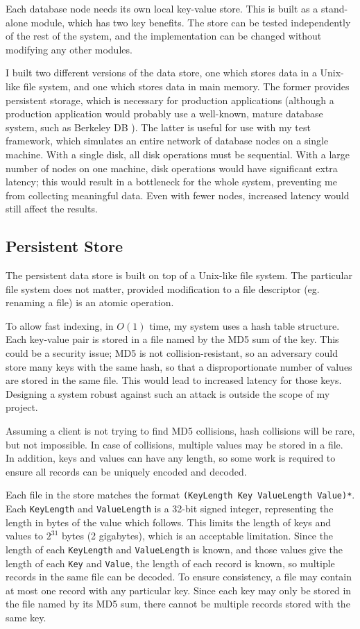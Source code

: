 \documentclass[12pt,a4paper,twoside,openany]{report}
\begin{document}
Each database node needs its own local key-value store.
This is built as a stand-alone module, which has two key benefits. The store can be tested independently of the rest of the system, and the implementation can be changed without modifying any other modules.

I built two different versions of the data store, one which stores data in a Unix-like file system, and one which stores data in main memory. The former provides persistent storage, which is necessary for production applications (although a production application would probably use a well-known, mature database system, such as Berkeley DB \cite{decandia2007dynamo}). The latter is useful for use with my test framework, which simulates an entire network of database nodes on a single machine.
With a single disk, all disk operations must be sequential. With a large number of nodes on one machine, disk operations would have significant extra latency; this would result in a bottleneck for the whole system, preventing me from collecting meaningful data. Even with fewer nodes, increased latency would still affect the results.

\subsection{Persistent Store}

The persistent data store is built on top of a Unix-like file system. The particular file system does not matter, provided modification to a file descriptor (eg. renaming a file) is an atomic operation.

To allow fast indexing, in $O(1)$ time, my system uses a hash table structure. Each key-value pair is stored in a file named by the MD5 sum of the key. This could be a security issue; MD5 is not collision-resistant, so an adversary could store many keys with the same hash, so that a disproportionate number of values are stored in the same file. This would lead to increased latency for those keys. Designing a system robust against such an attack is outside the scope of my project.

Assuming a client is not trying to find MD5 collisions, hash collisions will be rare, but not impossible. In case of collisions, multiple values may be stored in a file. In addition, keys and values can have any length, so some work is required to ensure all records can be uniquely encoded and decoded.

Each file in the store matches the format \verb|(KeyLength Key ValueLength Value)*|. Each \verb|KeyLength| and \verb|ValueLength| is a 32-bit signed integer, representing the length in bytes of the value which follows. This limits the length of keys and values to $2^{31}$ bytes (2 gigabytes), which is an acceptable limitation. Since the length of each \verb|KeyLength| and \verb|ValueLength| is known, and those values give the length of each \verb|Key| and \verb|Value|, the length of each record is known, so multiple records in the same file can be decoded. To ensure consistency, a file may contain at most one record with any particular key. Since each key may only be stored in the file named by its MD5 sum, there cannot be multiple records stored with the same key.
\end{document}
